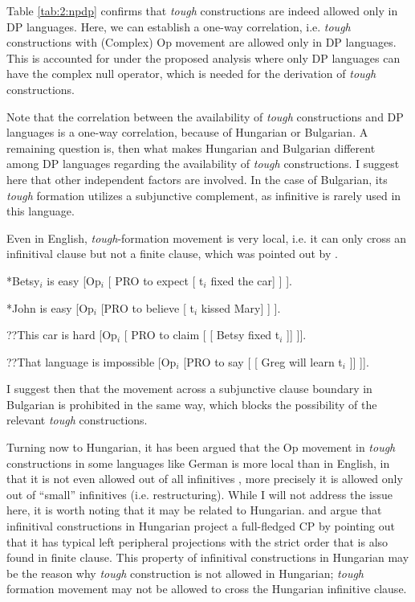 \documentclass[output=paper,colorlinks,citecolor=brown,
]{langscibook}
\begin{document}
Table \ref{tab:2:npdp} confirms that \textit{tough} constructions are indeed allowed only in DP languages. Here, we can establish a one-way correlation, i.e. \textit{tough} constructions with (Complex) Op movement are allowed only in DP languages. This is accounted for under the proposed analysis where only DP languages can have the complex null operator, which is needed for the derivation of \textit{tough} constructions.

Note that the correlation between the availability of \textit{tough} constructions and DP languages is a one-way correlation, because of Hungarian or Bulgarian. A remaining question is, then what makes Hungarian and Bulgarian different among DP languages regarding the availability of \textit{tough} constructions. I suggest here that other independent factors are involved. In the case of Bulgarian, its \textit{tough} formation utilizes a subjunctive complement, as infinitive is rarely used in this language. 

Even in English, \textit{tough}-formation movement is very local, i.e. it can only cross an infinitival clause but not a finite clause, which was pointed out by \citet{Stowell1986}. 

\begin{exe}
\ex \label{36ha}
\begin{xlist}
\ex \label{36aha}
*Betsy$_{i}$ is easy [Op$_{i}$ [ PRO to expect [ t$_{i}$ fixed the car] ] ].

\ex \label{36bha}
*John is easy [Op$_{i}$ [PRO to believe [ t$_{i}$ kissed Mary] ] ]. 

\ex \label{36cha}
??This car is hard [Op$_{i}$ [ PRO to claim [ [ Betsy fixed t$_{i}$ ]] ]].

\ex \label{36dha}
??That language is impossible [Op$_{i}$ [PRO to say [ [ Greg will learn t$_{i}$ ]] ]].  \hfill \citep[477]{Stowell1986}                                        
\end{xlist}
\end{exe}

I suggest then that the movement across a subjunctive clause boundary in Bulgarian is prohibited in the same way, which blocks the possibility of the relevant \textit{tough} constructions.

Turning now to Hungarian, it has been argued that the Op movement in \textit{tough} constructions in some languages like German is more local than in English, in that it is not even allowed out of all infinitives \citep{Wurmbrand2001,Kayne1989,Roberts1997}, more precisely it is allowed only out of “small” infinitives (i.e. restructuring). While I will not address the issue here, it is worth noting that it may be related to Hungarian. \citet{Kenesei2005} and \citet{Dalmi2004} argue that infinitival constructions in Hungarian project a full-fledged CP by pointing out that it has typical left peripheral projections with the strict order that is also found in finite clause. This property of infinitival constructions in Hungarian may be the reason why \textit{tough} construction is not allowed in Hungarian; \textit{tough} formation movement may not be allowed to cross the Hungarian infinitive clause.
\end{document}
